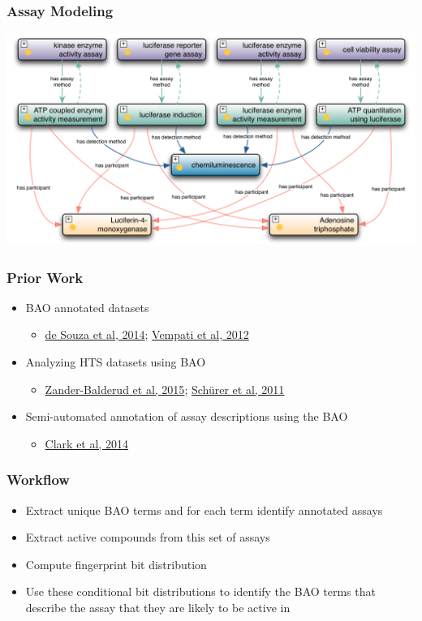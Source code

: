 \documentclass[anchorcolor=blue,linkcolor=blue]{beamer}
\begin{document}
\begin{frame}
  \frametitle{Assay Modeling}
  \begin{center}
    \includegraphics[width=0.9\paperwidth]{assaymodel}    
  \end{center}
\end{frame}

\begin{frame}
  \frametitle{Prior Work}
  \begin{itemize}
  \item BAO annotated datasets
    \begin{itemize}
    \item \href{http://www.ncbi.nlm.nih.gov/pubmed/24441647}{de Souza et al, 2014}; \href{http://www.ncbi.nlm.nih.gov/pubmed/23155465}{Vempati et al, 2012}
    \end{itemize}
  \item Analyzing HTS datasets using BAO
    \begin{itemize}
    \item \href{http://www.ncbi.nlm.nih.gov/pubmed/25512330}{Zander-Balderud et al, 2015}; \href{http://www.ncbi.nlm.nih.gov/pubmed/21471461}{Sch\"{u}rer et al, 2011}
    \end{itemize}
  \item Semi-automated annotation of assay descriptions using the BAO 
    \begin{itemize}
    \item \href{http://www.ncbi.nlm.nih.gov/pubmed/25165633}{Clark et al, 2014}
    \end{itemize}
  \end{itemize}
\end{frame}


\begin{frame} 
  \frametitle{Workflow}
  \begin{itemize}
  \item Extract unique BAO terms and for each term identify annotated assays
  \item Extract active compounds from this set of assays
  \item Compute fingerprint bit distribution
  \item Use these conditional bit distributions to identify the BAO terms that describe the assay that they are likely to be active in
  \end{itemize}
\end{frame}
\end{document}

